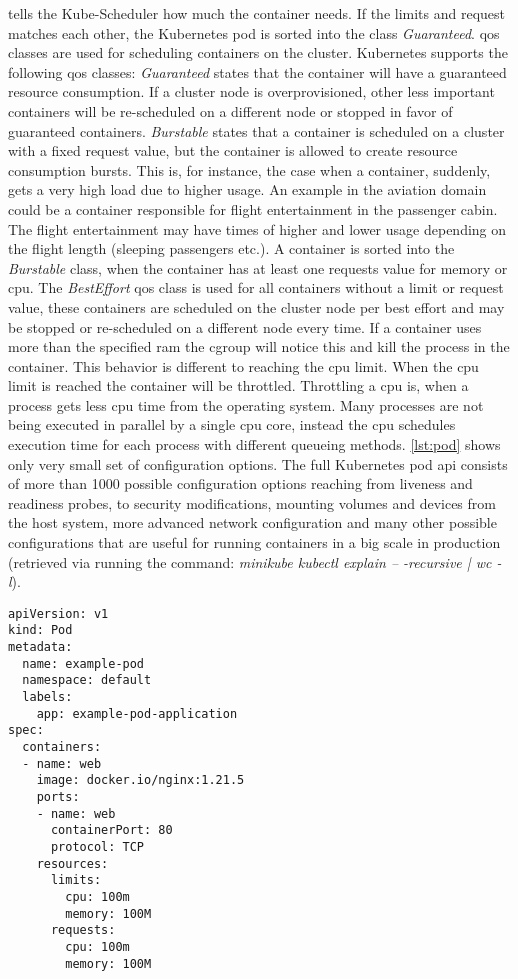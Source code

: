 \documentclass[titlepage]{report}
\begin{document}
tells the Kube-Scheduler how much the container needs. If the limits and request matches each other, the Kubernetes pod is sorted into the  class \emph{Guaranteed}\cite{KubernetesQOS}. \gls{qos} classes are used for scheduling containers on the cluster.
Kubernetes supports the following \gls{qos} classes: \emph{Guaranteed} states that the container will have a guaranteed resource consumption. If a cluster node is overprovisioned, other less important containers will be re-scheduled on a different node or 
stopped in favor of guaranteed containers. \emph{Burstable} states that a container is scheduled on a cluster with a fixed request value, but the container is allowed to create resource consumption bursts. This is, for instance,
the case when a container, suddenly, gets a very high load due to higher usage. An example in the aviation domain could be a container responsible for flight entertainment in the passenger cabin. The flight entertainment may have times
of higher and lower usage depending on the flight length (sleeping passengers etc.). A container is sorted into the \emph{Burstable} class, when the container has at least one requests value for memory or \gls{cpu}. The \emph{BestEffort}
\gls{qos} class is used for all containers without a limit or request value, these containers are scheduled on the cluster node per best effort and may be stopped or re-scheduled on a different node every time.
If a container uses more than the specified \gls{ram} the \gls{cgroup} will notice this and kill the process in the container. This behavior is different to reaching the \gls{cpu} limit. When the \gls{cpu} limit is reached the container
will be throttled. Throttling a \gls{cpu} is, when a process gets less \gls{cpu} time from the operating system. Many processes are not being executed in parallel by a single \gls{cpu} core, instead the \gls{cpu} schedules execution time
for each process with different queueing methods. \autoref{lst:pod} shows only very small set of configuration options. The full Kubernetes pod \gls{api} consists of more than 1000 possible configuration options reaching from liveness and readiness probes,
to security modifications, mounting volumes and devices from the host system, more advanced network configuration and many other possible configurations that are useful for running containers in a big scale in production (retrieved via running the command:
\emph{minikube kubectl explain -- -recursive | wc -l}).

\begin{minipage}{\linewidth}
\begin{lstlisting}[caption={An example pod definition in YAML},label={lst:pod}]
apiVersion: v1
kind: Pod
metadata:
  name: example-pod
  namespace: default
  labels:
    app: example-pod-application
spec:
  containers:
  - name: web
    image: docker.io/nginx:1.21.5
    ports:
    - name: web
      containerPort: 80
      protocol: TCP
    resources:
      limits:
        cpu: 100m
        memory: 100M
      requests:
        cpu: 100m
        memory: 100M
\end{lstlisting}
\end{minipage}
\end{document}

